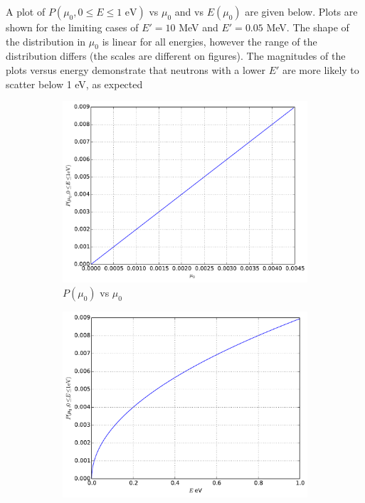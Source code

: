 \documentclass[12pt]{article}
\newenvironment{solution}[1][Solution]{\begin{trivlist}
\item[\hskip \labelsep {\bfseries #1} {\hspace{-0.2em}\bfseries:}]\hspace{0.3in}\newline}{\end{trivlist}}
\begin{document}
\begin{solution}
A plot of $P(\mu_0,0\leq E \leq 1\text{ eV})$ vs $\mu_0$ and vs $E(\mu_0)$ are given below.
Plots are shown for the limiting cases of $E'=10$ MeV and $E'=0.05$ MeV.  The shape of the
distribution in $\mu_0$ is linear for all energies, however the range of the
distribution differs (the scales are different on figures).  The magnitudes of the plots versus energy demonstrate
that neutrons with a lower $E'$ are more likely to scatter below 1 eV, as expected
\begin{figure}[hb]
    \begin{subfigure}{0.5\textwidth}
    \includegraphics[width=\textwidth]{scat_kernel_05.pdf}
    \caption{$P(\mu_0)$ vs $\mu_0$}
\end{subfigure}
    \begin{subfigure}{0.5\textwidth}
    \includegraphics[width=\textwidth]{scat_kernel_E_05.pdf}

\end{subfigure}
\end{figure}
\end{solution}
\end{document}
